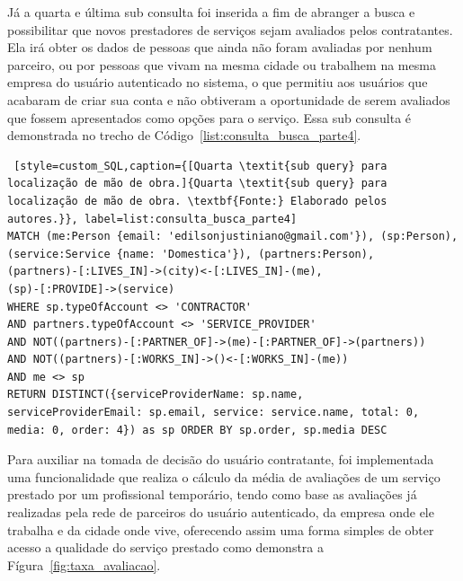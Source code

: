 Já a quarta e última sub consulta foi inserida a fim de abranger a busca e possibilitar que novos prestadores de serviços sejam avaliados pelos contratantes. Ela irá obter os dados de pessoas que ainda não foram avaliadas por nenhum parceiro, ou por pessoas que vivam na mesma cidade ou trabalhem na mesma empresa do usuário autenticado no sistema, o que permitiu aos usuários que acabaram de criar sua conta e não obtiveram a oportunidade de serem avaliados que fossem apresentados como opções para o serviço. Essa sub consulta é demonstrada no trecho de Código~\ref{list:consulta_busca_parte4}.


\begin{lstlisting} [style=custom_SQL,caption={[Quarta \textit{sub query} para localização de mão de obra.]{Quarta \textit{sub query} para localização de mão de obra. \textbf{Fonte:} Elaborado pelos autores.}}, label=list:consulta_busca_parte4] 	
MATCH (me:Person {email: 'edilsonjustiniano@gmail.com'}), (sp:Person),
(service:Service {name: 'Domestica'}), (partners:Person),
(partners)-[:LIVES_IN]->(city)<-[:LIVES_IN]-(me), 
(sp)-[:PROVIDE]->(service)
WHERE sp.typeOfAccount <> 'CONTRACTOR' 
AND partners.typeOfAccount <> 'SERVICE_PROVIDER'
AND NOT((partners)-[:PARTNER_OF]->(me)-[:PARTNER_OF]->(partners))
AND NOT((partners)-[:WORKS_IN]->()<-[:WORKS_IN]-(me))
AND me <> sp
RETURN DISTINCT({serviceProviderName: sp.name, 
serviceProviderEmail: sp.email, service: service.name, total: 0,
media: 0, order: 4}) as sp ORDER BY sp.order, sp.media DESC
\end{lstlisting}

\par Para auxiliar na tomada de decisão do usuário contratante, foi implementada uma funcionalidade que realiza o cálculo da média de avaliações de um serviço prestado por um profissional temporário, tendo como base as avaliações já realizadas pela rede de parceiros do usuário autenticado, da empresa onde ele trabalha e da cidade onde vive, oferecendo assim uma forma simples de obter acesso a qualidade do serviço prestado como demonstra a Fígura~\ref{fig:taxa_avaliacao}.

